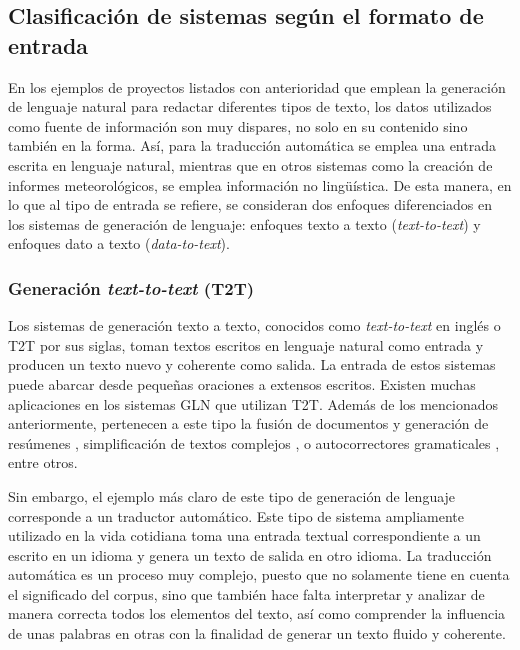 \subsection{Clasificación de sistemas según el formato de entrada}
En los ejemplos de proyectos listados con anterioridad que emplean la generación de lenguaje natural para redactar diferentes tipos de texto, los datos utilizados como fuente de información son muy dispares, no solo en su contenido sino también en la forma. Así, para la traducción automática se emplea una entrada escrita en lenguaje natural, mientras que en otros sistemas como la creación de informes meteorológicos, se emplea información no lingüística. De esta manera, en lo que al tipo de entrada se refiere, se consideran dos enfoques diferenciados en los sistemas de generación de lenguaje: enfoques texto a texto (\textit{text-to-text}) y enfoques dato a texto (\textit{data-to-text}).

\subsubsection{Generación \textit{text-to-text} (T2T)}
Los sistemas de generación texto a texto, conocidos como \textit{text-to-text} en inglés o T2T por sus siglas, toman textos escritos en lenguaje natural como entrada y producen un texto nuevo y coherente como salida. La entrada de estos sistemas puede abarcar desde pequeñas oraciones a extensos escritos. Existen muchas aplicaciones en los sistemas GLN que utilizan T2T. Además de los mencionados anteriormente, pertenecen a este tipo la fusión de documentos y generación de resúmenes \citep{clarke2010discourse}, simplificación de textos complejos \citep{sulem2018simple}, o autocorrectores gramaticales \citep{Ge2019AutomaticGE}, entre otros. 

Sin embargo, el ejemplo más claro de este tipo de generación de lenguaje corresponde a un traductor automático. Este tipo de sistema ampliamente utilizado en la vida cotidiana toma una entrada textual correspondiente a un escrito en un idioma y genera un texto de salida en otro idioma. La traducción automática es un proceso muy complejo, puesto que no solamente tiene en cuenta el significado del corpus, sino que también hace falta interpretar y analizar de manera correcta todos los elementos del texto, así como comprender la influencia de unas palabras en otras con la finalidad de  generar un texto fluido y coherente.

